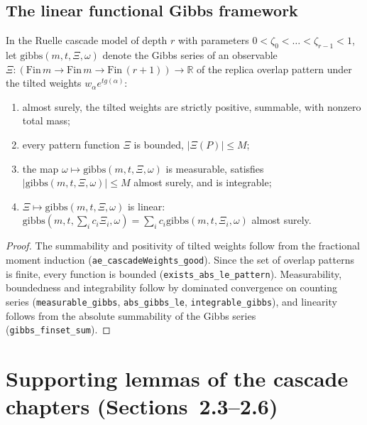 \subsection*{The linear functional Gibbs framework}

\begin{theorem}\label{thm:sg:gibbs-linear-framework}
  \leanok
In the Ruelle cascade model of depth $r$ with parameters $0 < \zeta_0 < \dots < \zeta_{r-1} < 1$, let $\mathrm{gibbs}(m, t, \Xi, \omega)$ denote the Gibbs series of an observable $\Xi : (\mathrm{Fin}\,m \to \mathrm{Fin}\,m \to \mathrm{Fin}\,(r+1)) \to \mathbb R$ of the replica overlap pattern under the tilted weights $w_\alpha e^{t g(\alpha)}$:
\begin{enumerate}
\item almost surely, the tilted weights are strictly positive, summable, with nonzero total mass;
\item every pattern function $\Xi$ is bounded, $|\Xi(P)| \le M$;
\item the map $\omega \mapsto \mathrm{gibbs}(m, t, \Xi, \omega)$ is measurable, satisfies $|\mathrm{gibbs}(m, t, \Xi, \omega)| \le M$ almost surely, and is integrable;
\item $\Xi \mapsto \mathrm{gibbs}(m, t, \Xi, \omega)$ is linear: $\mathrm{gibbs}(m, t, \sum_i c_i \Xi_i, \omega) = \sum_i c_i \mathrm{gibbs}(m, t, \Xi_i, \omega)$ almost surely.
\end{enumerate}
\end{theorem}
\begin{proof}
  \leanok
The summability and positivity of tilted weights follow from the fractional moment induction (\texttt{ae\_cascadeWeights\_good}). Since the set of overlap patterns is finite, every function is bounded (\texttt{exists\_abs\_le\_pattern}). Measurability, boundedness and integrability follow by dominated convergence on counting series (\texttt{measurable\_gibbs}, \texttt{abs\_gibbs\_le}, \texttt{integrable\_gibbs}), and linearity follows from the absolute summability of the Gibbs series (\texttt{gibbs\_finset\_sum}).
\end{proof}

\section{Supporting lemmas of the cascade chapters (Sections~2.3--2.6)}\label{sec:sg:cascade-support}

